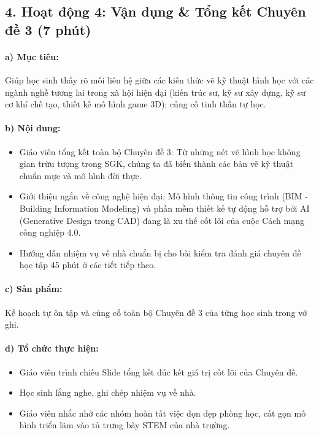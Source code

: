 \documentclass[12pt, a4paper]{article}
\begin{document}
\subsection*{4. Hoạt động 4: Vận dụng \& Tổng kết Chuyên đề 3 (7 phút)}

\paragraph{a) Mục tiêu:} Giúp học sinh thấy rõ mối liên hệ giữa các kiến thức vẽ kỹ thuật hình học với các ngành nghề tương lai trong xã hội hiện đại (kiến trúc sư, kỹ sư xây dựng, kỹ sư cơ khí chế tạo, thiết kế mô hình game 3D); củng cố tinh thần tự học.

\paragraph{b) Nội dung:}
\begin{itemize}[leftmargin=0.6cm]
    \item Giáo viên tổng kết toàn bộ Chuyên đề 3: Từ những nét vẽ hình học không gian trừu tượng trong SGK, chúng ta đã biến thành các bản vẽ kỹ thuật chuẩn mực và mô hình đời thực.
    \item Giới thiệu ngắn về công nghệ hiện đại: Mô hình thông tin công trình (BIM - Building Information Modeling) và phần mềm thiết kế tự động hỗ trợ bởi AI (Generative Design trong CAD) đang là xu thế cốt lõi của cuộc Cách mạng công nghiệp 4.0.
    \item Hướng dẫn nhiệm vụ về nhà chuẩn bị cho bài kiểm tra đánh giá chuyên đề học tập 45 phút ở các tiết tiếp theo.
\end{itemize}

\paragraph{c) Sản phẩm:} Kế hoạch tự ôn tập và củng cố toàn bộ Chuyên đề 3 của từng học sinh trong vở ghi.

\paragraph{d) Tổ chức thực hiện:}
\begin{itemize}[leftmargin=0.8cm]
    \item Giáo viên trình chiếu Slide tổng kết đúc kết giá trị cốt lõi của Chuyên đề.
    \item Học sinh lắng nghe, ghi chép nhiệm vụ về nhà.
    \item Giáo viên nhắc nhở các nhóm hoàn tất việc dọn dẹp phòng học, cất gọn mô hình triển lãm vào tủ trưng bày STEM của nhà trường.
\end{itemize}
\end{document}
